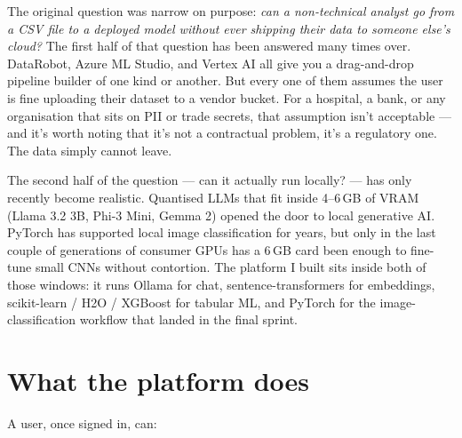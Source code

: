\documentclass[12pt, a4paper]{report}
\begin{document}
The original question was narrow on purpose: \textit{can a non-technical
analyst go from a CSV file to a deployed model without ever shipping
their data to someone else's cloud?} The first half of that question has
been answered many times over. DataRobot, Azure ML Studio, and Vertex AI
all give you a drag-and-drop pipeline builder of one kind or another.
But every one of them assumes the user is fine uploading their dataset
to a vendor bucket. For a hospital, a bank, or any organisation that
sits on PII or trade secrets, that assumption isn't acceptable --- and
it's worth noting that it's not a contractual problem, it's a
regulatory one. The data simply cannot leave.

The second half of the question --- can it actually run locally? ---
has only recently become realistic. Quantised LLMs that fit inside
4--6\,GB of VRAM (Llama 3.2 3B, Phi-3 Mini, Gemma 2) opened the door to
local generative AI. PyTorch has supported local image classification
for years, but only in the last couple of generations of consumer GPUs
has a 6\,GB card been enough to fine-tune small CNNs without contortion.
The platform I built sits inside both of those windows: it runs Ollama
for chat, sentence-transformers for embeddings, scikit-learn / H2O /
XGBoost for tabular ML, and PyTorch for the image-classification
workflow that landed in the final sprint.

\section{What the platform does}

A user, once signed in, can:
\end{document}
